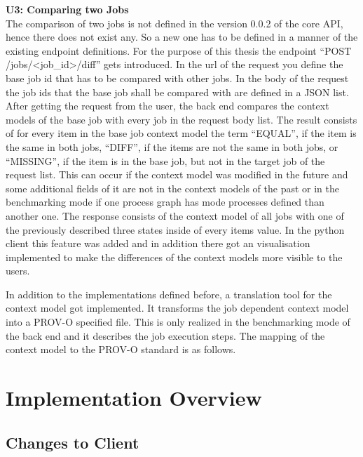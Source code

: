 \documentclass[draft,final]{vutinfth} %
\begin{document}
\textbf{U3: Comparing two Jobs} \\
The comparison of two jobs is not defined in the version 0.0.2 of the core API, hence there does not exist any. So a new one has to be defined in a manner of the existing endpoint definitions. For the purpose of this thesis the endpoint  “POST /jobs/<job\_id>/diff” gets introduced. In the url of the request you define the base job id that has to be compared with other jobs. In the body of the request the job ids that the base job shall be compared with are defined in a JSON list. After getting the request from the user, the back end compares the context models of the base job with every job in the request body list. The result consists of for every item in the base job context model the term “EQUAL”, if the item is the same in both jobs, “DIFF”, if the items are not the same in both jobs, or “MISSING”, if the item is in the base job, but not in the target job of the request list. This can occur if the context model was modified in the future and some additional fields of it are not in the context models of the past or in the benchmarking mode if one process graph has mode processes defined than another one. The response consists of the context model of all jobs with one of the previously described three states inside of every items value. In the python client this feature was added and in addition there got an visualisation implemented to make the differences of the context models more visible to the users.


In addition to the implementations defined before, a translation tool for the context model got implemented. It transforms the job dependent context model into a PROV-O specified file. This is only realized in the benchmarking mode of the back end and it describes the job execution steps. The mapping of the context model to the PROV-O standard is as follows.


\section{Implementation Overview}\label{Implementation Overview}

\subsection{Changes to Client}
\end{document}
